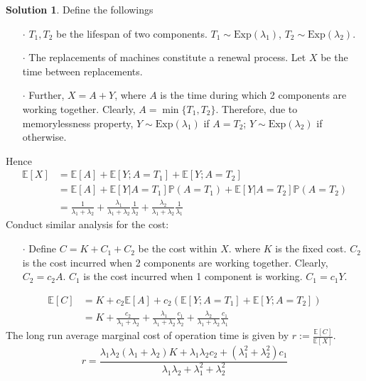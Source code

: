 \documentclass[a4paper, 10pt]{article}
\theoremstyle{definition}
\theoremstyle{hSol}
\newtheorem*{solution}{Solution}
\begin{document}
\begin{solution} Define the followings
\begin{itemize} 
  \item[$\cdot$] $T_1, T_2$ be the lifespan of two components. $T_1 \sim \text{Exp}(\lambda_1)$, $T_2 \sim \text{Exp}(\lambda_2)$.
  \item[$\cdot$] The replacements of machines constitute a renewal process. Let $X$ be the time between replacements. 
  \item[$\cdot$] Further, $X=A+Y$, where $A$ is the time during which 2 components are working together. Clearly, $A=\min\{T_1, T_2\}$. Therefore, due to memorylessness property, $Y\sim \text{Exp}(\lambda_1)$ if $A=T_2$; $Y\sim \text{Exp}(\lambda_2)$ if otherwise.
\end{itemize}
Hence
\begin{equation}
  \begin{split}
    \mathbb{E}\left[X\right] &= \mathbb{E}\left[A\right] + \mathbb{E}\left[Y; A=T_1\right] + \mathbb{E}\left[Y; A=T_2\right] \\
    &= \mathbb{E}\left[A\right] + \mathbb{E}\left[Y|A=T_1\right]\mathbb{P}\left(A=T_1\right) + \mathbb{E}\left[Y|A=T_2\right]\mathbb{P}\left(A=T_2\right) \\
    &= \frac{1}{\lambda_1 + \lambda_2} + \frac{\lambda_1}{\lambda_1 + \lambda_2}\frac{1}{\lambda_2} + \frac{\lambda_2}{\lambda_1 + \lambda_2}\frac{1}{\lambda_1}
  \end{split}
\end{equation}
Conduct similar analysis for the cost:
\begin{itemize}
  \item[$\cdot$] Define $C=K+C_1+C_2$ be the cost within $X$. where $K$ is the fixed cost. $C_2$ is the cost incurred when 2 components are working together. Clearly, $C_2=c_2A$. $C_1$ is the cost incurred when 1 component is working. $C_1=c_1Y$.
\end{itemize}
\begin{equation}
  \begin{split}
    \mathbb{E}\left[C\right] &= K+c_2\mathbb{E}\left[A\right] + c_2\left(\mathbb{E}\left[Y; A=T_1\right] + \mathbb{E}\left[Y; A=T_2\right]\right) \\
    &= K + \frac{c_2}{\lambda_1 + \lambda_2} + \frac{\lambda_1}{\lambda_1 + \lambda_2}\frac{c_1}{\lambda_2} + \frac{\lambda_2}{\lambda_1 + \lambda_2}\frac{c_1}{\lambda_1}
  \end{split}
\end{equation}
The long run average marginal cost of operation time is given by $r:=\frac{\mathbb{E}\left[C\right]}{\mathbb{E}\left[X\right]}$.
\begin{equation}
  r= \frac{\lambda_1 \lambda_2 (\lambda_1 + \lambda_2)K + \lambda_1 \lambda_2 c_2 + (\lambda_1^2 + \lambda_2^2) c_1}{\lambda_1 \lambda_2 + \lambda_1^2 + \lambda_2^2}
\end{equation}
\end{solution}
\end{document}
